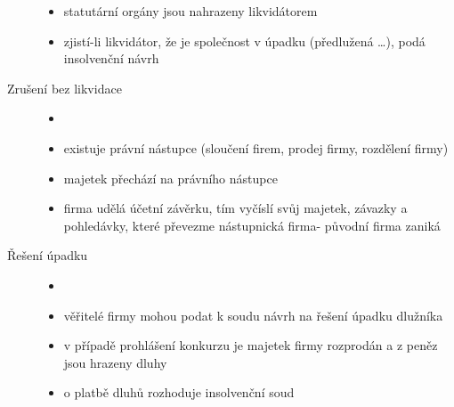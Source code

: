\documentclass[11pt,a4paper,twoside]{book}
\begin{document}
\begin{description}
\begin{itemize}
					\item statutární orgány jsou nahrazeny likvidátorem
					\item zjistí-li likvidátor, že je společnost v úpadku (předlužená \ldots), podá insolvenční návrh
				\end{itemize}
			\item[Zrušení bez likvidace]
				\begin{itemize}
					\item []
					\item existuje právní nástupce (sloučení firem, prodej firmy, rozdělení firmy)
					\item majetek přechází na právního nástupce
					\item firma udělá účetní závěrku, tím vyčíslí svůj majetek, závazky a pohledávky, které převezme nástupnická firma- původní firma zaniká
				\end{itemize}
			\item[Řešení úpadku]
				\begin{itemize}
					\item []
					\item věřitelé firmy mohou podat k soudu návrh na řešení úpadku dlužníka
					\item v případě prohlášení konkurzu je majetek firmy rozprodán a z peněz jsou hrazeny dluhy
					\item o platbě dluhů rozhoduje insolvenční soud
				\end{itemize}
		\end{description}
\end{document}
